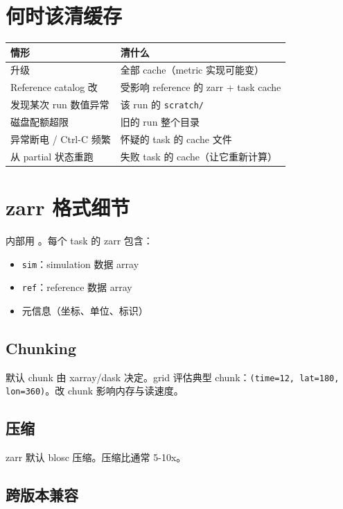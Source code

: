 \section{何时该清缓存}

\begin{longtable}{p{5cm} p{8cm}}
  \toprule
  情形 & 清什么 \\
  \midrule
  \endhead
  \openbench{} 升级 & 全部 cache（metric 实现可能变） \\
  Reference catalog 改 & 受影响 reference 的 zarr + task cache \\
  发现某次 run 数值异常 & 该 run 的 \texttt{scratch/} \\
  磁盘配额超限 & 旧的 run 整个目录 \\
  异常断电 / Ctrl-C 频繁 & 怀疑的 task 的 cache 文件 \\
  从 partial 状态重跑 & 失败 task 的 cache（让它重新计算） \\
  \bottomrule
\end{longtable}

\section{zarr 格式细节}

\openbench{} 内部用 。每个 task 的 zarr 包含：

\begin{itemize}
  \item \texttt{sim}：simulation 数据 array
  \item \texttt{ref}：reference 数据 array
  \item 元信息（坐标、单位、标识）
\end{itemize}

\subsection{Chunking}

默认 chunk 由 xarray/dask 决定。grid 评估典型 chunk：\texttt{(time=12, lat=180, lon=360)}。改 chunk 影响内存与读速度。

\subsection{压缩}

zarr 默认 blosc 压缩。压缩比通常 5-10x。

\subsection{跨版本兼容}

